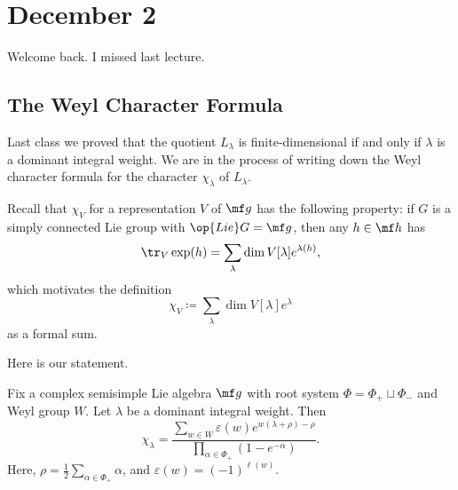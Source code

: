 \documentclass[../notes.tex]{subfiles}
\begin{document}
\section{December 2}
Welcome back. I missed last lecture.

\subsection{The Weyl Character Formula}
Last class we proved that the quotient $L_\lambda$ is finite-dimensional if and only if $\lambda$ is a dominant integral weight. We are in the process of writing down the Weyl character formula for the character $\chi_\lambda$ of $L_\lambda$.
\begin{remark}
	Recall that $\chi_V$ for a representation $V$ of $\mf g$  has the following property: if $G$ is a simply connected Lie group with $\op{Lie}G=\mf g$, then any $h\in\mf h$ has
	\[\tr_V\exp(h)=\sum_\lambda\dim V[\lambda]e^{\lambda(h)},\]
	which motivates the definition
	\[\chi_V\coloneqq\sum_{\lambda}\dim V[\lambda]e^\lambda\]
	as a formal sum.
\end{remark}
Here is our statement.
\begin{theorem}
	Fix a complex semisimple Lie algebra $\mf g$ with root system $\Phi=\Phi_+\sqcup\Phi_-$ and Weyl group $W$. Let $\lambda$ be a dominant integral weight. Then
	\[\chi_\lambda=\frac{\displaystyle\sum_{w\in W}\varepsilon(w)e^{w(\lambda+\rho)-\rho}}{\displaystyle\prod_{\alpha\in\Phi_+}\left(1-e^{-\alpha}\right)}.\]
	Here, $\rho=\frac12\sum_{\alpha\in\Phi_+}\alpha$, and $\varepsilon(w)=(-1)^{\ell(w)}$.
\end{theorem}
\end{document}
